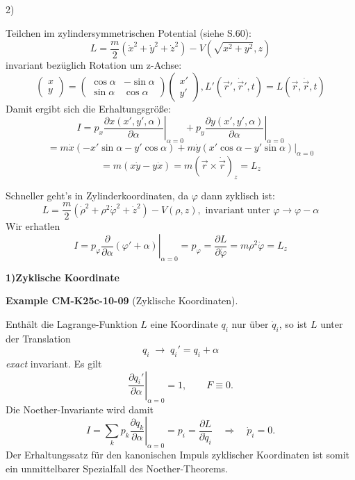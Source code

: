 \documentclass[10pt, letterpaper]{article}
\newcommand{\CustomHeading}[3]{%
  \par\medskip\noindent%
  \textbf{#1 #2} \textnormal{(#3)}.\enskip%
}
\newenvironment{EXA}[2]{\begin{unitbox}\CustomHeading{Example}{#1}{#2}}{\end{unitbox}}
\begin{document}
2) 

Teilchen im zylindersymmetrischen Potential (siehe S.60):
\[L = \frac{m}{2}(\dot{x}^2 + \dot{y}^2 + \dot{z}^2) - V(\sqrt{x^2+y^2},z)\]
invariant bezüglich Rotation um z-Achse:
\[\begin{pmatrix} x \\ y \end{pmatrix} = \begin{pmatrix} \cos\alpha & -\sin\alpha \\ \sin\alpha & \cos\alpha \end{pmatrix} \begin{pmatrix} x' \\ y' \end{pmatrix}, L'(\vec{r}',\dot{\vec{r}}',t) = L(\vec{r},\dot{\vec{r}},t)\]
Damit ergibt sich die Erhaltungsgröße:
\[I = p_x \left.\frac{\partial x(x',y',\alpha)}{\partial \alpha}\right|_{\alpha=0} + p_y \left.\frac{\partial y(x',y',\alpha)}{\partial \alpha}\right|_{\alpha=0}\]
\[= m\dot{x}(-x'\sin\alpha-y'\cos\alpha) + m\dot{y}(x'\cos\alpha-y'\sin\alpha)\Big|_{\alpha=0}\]
\[= m(x\dot{y}-y\dot{x}) = m(\vec{r}\times\dot{\vec{r}})_z = L_z\]

Schneller geht's in Zylinderkoordinaten, da $\varphi$ dann zyklisch ist:
\[L = \frac{m}{2}(\dot{\rho}^2 + \rho^2\dot{\varphi}^2 + \dot{z}^2) - V(\rho,z), \text{ invariant unter } \varphi \rightarrow \varphi-\alpha\]
Wir erhatlen
$$I = p_\varphi \left.\frac{\partial}{\partial\alpha}(\varphi'+\alpha)\right|_{\alpha=0} = p_\varphi = \frac{\partial L}{\partial\dot{\varphi}} = m\rho^2\dot{\varphi} = L_z$$





\textbf{1)\;Zyklische Koordinate}\\

\begin{EXA}{CM-K25c-10-09}{Zyklische Koordinaten}
Enthält die Lagrange-Funktion $L$ eine Koordinate $q_i$ nur über
$\dot q_i$, so ist $L$ unter der Translation
\[
  q_i\;\longrightarrow\;q_i' = q_i + \alpha
\]
\emph{exact} invariant.  Es gilt
\[
  \left.\frac{\partial q_i'}{\partial\alpha}\right|_{\alpha=0}=1,
  \qquad
  F\equiv0 .
\]
Die Noether-Invariante wird damit
\[
  I
  =\sum_{k} p_k
     \left.\frac{\partial q_k}{\partial\alpha}\right|_{\alpha=0}
  =p_i=\frac{\partial L}{\partial\dot q_i}
  \quad\Longrightarrow\quad
  \dot p_i = 0 .
\]
Der Erhaltungssatz für den kanonischen Impuls zyklischer Koordinaten
ist somit ein unmittelbarer Spezialfall des Noether-Theorems.
\end{EXA}
\end{document}
